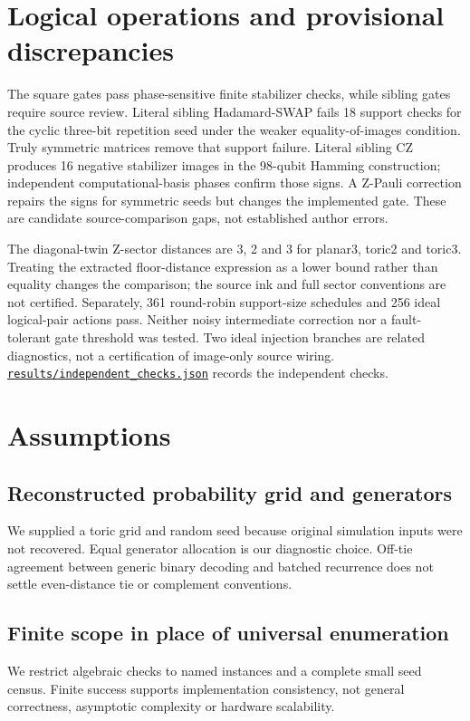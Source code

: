 \documentclass[11pt]{article}
\begin{document}
\section{Logical operations and provisional discrepancies}
The square gates pass phase-sensitive finite stabilizer checks, while sibling gates require source review. Literal sibling Hadamard-SWAP fails 18 support checks for the cyclic three-bit repetition seed under the weaker equality-of-images condition. Truly symmetric matrices remove that support failure. Literal sibling CZ produces 16 negative stabilizer images in the 98-qubit Hamming construction; independent computational-basis phases confirm those signs. A Z-Pauli correction repairs the signs for symmetric seeds but changes the implemented gate. These are candidate source-comparison gaps, not established author errors.

The diagonal-twin Z-sector distances are 3, 2 and 3 for planar3, toric2 and toric3. Treating the extracted floor-distance expression as a lower bound rather than equality changes the comparison; the source ink and full sector conventions are not certified. Separately, 361 round-robin support-size schedules and 256 ideal logical-pair actions pass. Neither noisy intermediate correction nor a fault-tolerant gate threshold was tested. Two ideal injection branches are related diagnostics, not a certification of image-only source wiring. \href{https://github.com/alectionary/vibe-math/blob/master/formalization/quintavalle-hgp/results/independent_checks.json}{\nolinkurl{results/independent_checks.json}} records the independent checks.

\section{Assumptions}
\subsection{Reconstructed probability grid and generators}
We supplied a toric grid and random seed because original simulation inputs were not recovered. Equal generator allocation is our diagnostic choice. Off-tie agreement between generic binary decoding and batched recurrence does not settle even-distance tie or complement conventions.
\subsection{Finite scope in place of universal enumeration}
We restrict algebraic checks to named instances and a complete small seed census. Finite success supports implementation consistency, not general correctness, asymptotic complexity or hardware scalability.
\end{document}
